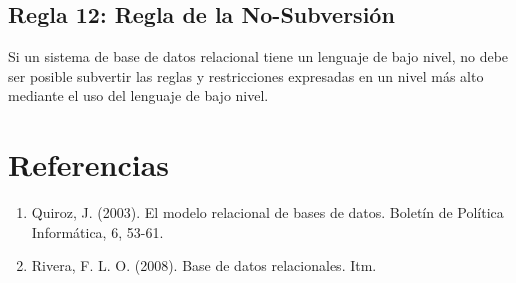 \documentclass{article}
\begin{document}
	\subsection*{Regla 12: Regla de la No-Subversión}
	Si un sistema de base de datos relacional tiene un lenguaje de bajo nivel, no debe ser posible subvertir las reglas y restricciones expresadas en un nivel más alto mediante el uso del lenguaje de bajo nivel.
	
	\section*{Referencias}
	\begin{enumerate}
		\item Quiroz, J. (2003). El modelo relacional de bases de datos. Boletín de Política Informática, 6, 53-61.
		\item Rivera, F. L. O. (2008). Base de datos relacionales. Itm.
	\end{enumerate}
	
\end{document}
